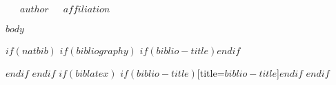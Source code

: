 \documentclass[letterpaper,12pt]{article}
\begin{document}
~~~\textmd{\small{$author$}}~~~\footnotesize{$affiliation$}
\vspace{-14pt}
\begin{multicols}{2}
\small
$body$
\footnotesize

$if(natbib)$
$if(bibliography)$
$if(biblio-title)$\renewcommand\bibname{$biblio-title$}$endif$

$endif$
$endif$
$if(biblatex)$
\printbibliography$if(biblio-title)$[title=$biblio-title$]$endif$
$endif$
\end{multicols}
\end{document}
